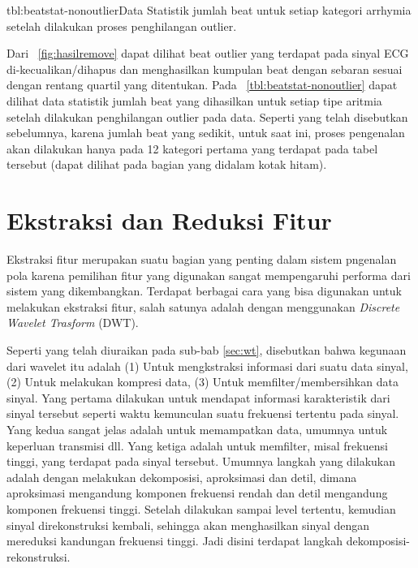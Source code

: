 {tbl:beatstat-nonoutlier}{Data Statistik jumlah beat untuk setiap  kategori
arrhymia setelah dilakukan proses penghilangan outlier.}

Dari \pic~\ref{fig:hasilremove} dapat dilihat beat outlier yang terdapat pada
sinyal ECG di-kecualikan/dihapus dan menghasilkan kumpulan beat dengan sebaran
sesuai dengan rentang quartil yang ditentukan. Pada
\tab~\ref{tbl:beatstat-nonoutlier} dapat dilihat data statistik jumlah beat yang
dihasilkan untuk setiap tipe aritmia setelah dilakukan penghilangan outlier
pada data. Seperti yang telah disebutkan sebelumnya, karena jumlah beat yang
sedikit, untuk saat ini, proses pengenalan akan dilakukan hanya pada 12 kategori
pertama yang terdapat pada tabel tersebut (dapat dilihat pada bagian yang
didalam kotak hitam).

\section{Ekstraksi dan Reduksi Fitur}
\label{sec:ekstrakwt}
Ekstraksi fitur merupakan suatu bagian yang penting dalam sistem pngenalan pola
karena pemilihan fitur yang digunakan sangat mempengaruhi performa dari sistem
yang dikembangkan. Terdapat berbagai cara yang bisa digunakan untuk melakukan
ekstraksi fitur, salah satunya adalah dengan menggunakan \emph{Discrete Wavelet
Trasform} (DWT). 

Seperti yang telah diuraikan pada sub-bab \ref{sec:wt}, disebutkan
bahwa kegunaan dari wavelet itu adalah (1) Untuk mengkstraksi informasi dari
suatu data sinyal, (2) Untuk melakukan kompresi data, (3) Untuk
memfilter/membersihkan data sinyal. Yang pertama dilakukan untuk mendapat
informasi karakteristik dari sinyal tersebut seperti waktu kemunculan suatu
frekuensi tertentu pada sinyal. Yang kedua sangat jelas adalah untuk memampatkan
data, umumnya untuk keperluan transmisi dll. Yang ketiga adalah untuk memfilter,
misal frekuensi tinggi, yang terdapat pada sinyal tersebut. Umumnya langkah yang
dilakukan adalah dengan melakukan dekomposisi, aproksimasi dan detil, dimana
aproksimasi mengandung komponen frekuensi rendah dan detil mengandung komponen
frekuensi tinggi. Setelah dilakukan sampai level tertentu, kemudian sinyal
direkonstruksi kembali, sehingga akan menghasilkan sinyal dengan mereduksi
kandungan frekuensi tinggi. Jadi disini terdapat langkah
dekomposisi-rekonstruksi.

